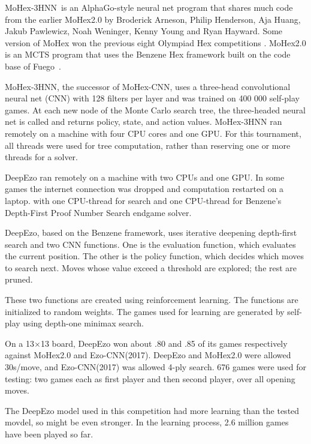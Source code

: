\documentclass{IOS-Book-Article}
\def\Eo{\mbox{\sc Ezo}}
\def\Ec{\mbox{\sc Ezo-CNN}}
\def\Ed{\mbox{\sc DeepEzo}}
\def\Mc{\mbox{\sc MoHex-CNN}}
\def\Mt{\mbox{\sc MoHex-3HNN}}
\def\Fuego{\mbox{\sc Fuego}}
\begin{document}
\Mt\ is an AlphaGo-style neural net program that shares
much code from the earlier MoHex2.0 by 
Broderick Arneson, Philip Henderson, Aja Huang, 
Jakub Pawlewicz, Noah Weninger, Kenny Young and Ryan Hayward.
Some version of MoHex won the previous
eight Olympiad Hex competitions \cite{HW17}.
MoHex2.0 is an MCTS program that uses the Benzene Hex framework
built on the code base of \Fuego\ \cite{fuego}.

\Mt{}, the successor of \Mc,
uses a three-head convolutional neural net (CNN)
with 128 filters per layer \cite{ijcai}
and was trained on 400 000 self-play games.
At each new node of the Monte Carlo search tree, 
the three-headed neural net is called
and returns policy, state, and action values.
\Mt{} ran remotely on a machine with four CPU cores and one GPU.
For this tournament, all threads were used for tree computation,
rather than reserving one or more threads for a solver.

\Ed{} ran remotely on a machine
with two CPUs and one GPU.
In some games the internet connection was dropped
and computation restarted on a  laptop.
with one CPU-thread for search and one CPU-thread for
Benzene's Depth-First Proof Number Search endgame solver.

\Ed{}, based on the Benzene framework,
uses iterative deepening depth-first search and 
two CNN functions.
One is the evaluation function, which evaluates the current position.
The other is the policy function, 
which decides which moves to search next.
Moves whose value exceed a threshold are explored;
the rest are pruned.

These two functions are created using reinforcement learning.
The functions are initialized to random weights.
The games used for learning are generated by self-play using
depth-one minimax search.

On a 13$\times$13 board,
\Ed{} won about .80 and .85 of its games respectively against
MoHex2.0 and \Ec{}(2017).
\Ed{} and MoHex2.0 were allowed 30s/move, and \Ec{}(2017) 
was allowed 4-ply search.
676 games were used for testing:
two games each as first player and then second player, over all opening moves.

The \Ed{} model used in this competition had more
learning than the tested movdel, so might be even stronger.
In the learning process, 2.6 million games have been played so far.
\end{document}

